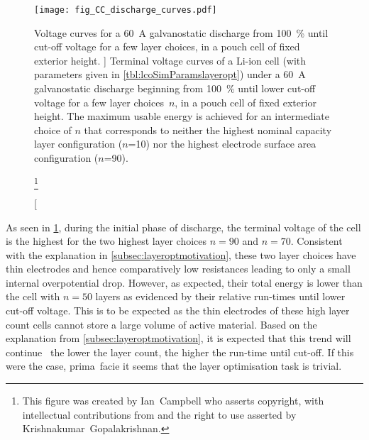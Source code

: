 \begin{figure}[!bp]
    \begin{minipage}[t]{\textwidth}
        \centering
        \texttt{[image: fig\_CC\_discharge\_curves.pdf]}
        \captionsetup{labelsep=note}
        \caption
        [%
        Voltage curves for a \SI{60}{\ampere} galvanostatic discharge from
        \SI{100}{\percent}  until cut-off voltage for a few layer
        choices, in a pouch cell of fixed exterior height.
        ]%
        {%
            Terminal voltage curves of a Li-ion cell (with parameters
            given in \cref{tbl:lcoSimParamslayeropt}) under a \SI{60}{\ampere}
            galvanostatic discharge beginning from \SI{100}{\percent}
             until lower cut-off voltage for a few layer
            choices~$n$, in a pouch cell of fixed exterior height. The maximum
            usable energy is achieved for an intermediate choice of $n$
            that corresponds to neither the highest nominal capacity layer
            configuration ($n$=\num{10}) nor the highest electrode surface area
            configuration ($n$=\num{90}).
        }%
        \label{fig:fig_CC_discharge_curves}
        \mpfootnotes[1]

        \footnote{This figure was created by \mbox{Ian Campbell} who asserts copyright,
            with intellectual contributions from and the right to use asserted by
        \mbox{Krishnakumar Gopalakrishnan}.}
    \end{minipage}
\end{figure}

As  seen  in \cref{fig:fig_CC_discharge_curves},  during  the  initial phase  of
discharge, the terminal voltage  of the cell is the highest  for the two highest
layer choices  \ie{} $n  = 90$  and $n=70$. Consistent  with the  explanation in
\cref{subsec:layeroptmotivation}, these  two layer choices have  thin electrodes
and  hence  comparatively low  resistances  leading  to  only a  small  internal
overpotential drop. However,  as expected, their total energy is  lower than the
cell with  $n=50$ layers as  evidenced by  their relative run-times  until lower
cut-off voltage.  This is to  be expected as the  thin electrodes of  these high
layer count cells cannot  store a large volume of active  material. Based on the
explanation  from \cref{subsec:layeroptmotivation},  it  is  expected that  this
trend  will continue  \mbox{\ie{} the}  lower the  layer count,  the higher  the
run-time until  cut-off. If this  were the case,  prima~facie it seems  that the
layer optimisation task is trivial.

